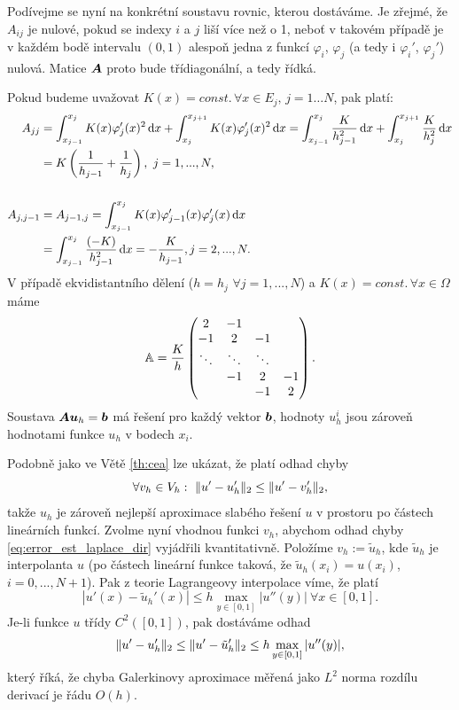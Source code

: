 Podívejme se nyní na konkrétní soustavu rovnic, kterou dostáváme.
Je zřejmé, že $A_{ij}$ je nulové, pokud se indexy $i$ a $j$ liší více než o 1, neboť v takovém případě je v každém bodě intervalu $(0,1)$ alespoň jedna z funkcí $\varphi_i$, $\varphi_j$ (a tedy i $\varphi_i'$, $\varphi_j'$) nulová. Matice $\mathbf{\boldsymbol{A}}$ proto bude třídiagonální, a tedy řídká.

Pokud budeme uvažovat $K(x) = const.\, \forall x\in E_j,\, j = 1\ldots N$, pak platí:
\begin{align*}
A_{jj} &= \int_{x_{j-1}}^{x_j} K(x)\varphi_j'(x)^2\,{\rm d} x + \int_{x_j}^{x_{j+1}} K(x) \varphi_j'(x)^2\,{\rm d} x
= \int_{x_{j-1}}^{x_j}\frac{K}{h_{j-1}^2}\,{\rm d} x + \int_{x_j}^{x_{j+1}}\frac{K}{h_j^2}\,{\rm d} x\\
&= K\left(\frac1{h_{j-1}} + \frac1{h_j}\right),~j=1,...,N,\\\\
A_{j,j-1} &= A_{j-1,j} = \int_{x_{j-1}}^{x_j}K(x)\varphi_{j-1}'(x)\varphi_j'(x)\,{\rm d} x\\
&= \int_{x_{j-1}}^{x_j}\frac{(-K)}{h_{j-1}^2} \,{\rm d} x = -\frac{K}{h_{j-1}}, j=2,...,N.
\end{align*}
V případě ekvidistantního dělení ($h=h_j$ $\forall j=1,...,N$) a $K(x) = const.\, \forall x\in\Omega$ máme
\[ {\mathbb{A}} = \frac{K}{h}\begin{pmatrix}2 & -1 & \\-1 & 2 & -1\\\ddots&\ddots&\ddots\\&-1 & 2 & -1\\&& -1 & 2\end{pmatrix}. \]
Soustava $\mathbf{\boldsymbol{A}}\mathbf{\boldsymbol{u}}_h=\mathbf{\boldsymbol{b}}$ má řešení pro každý vektor $\mathbf{\boldsymbol{b}}$,
hodnoty $u_h^i$ jsou zároveň hodnotami funkce $u_h$ v bodech $x_i$.

Podobně jako ve Větě \ref{th:cea} lze ukázat, že platí odhad chyby
\begin{equation}\label{eq:error_est_laplace_dir}
\forall v_h\in V_h:~\|u'-u_h'\|_2 \le \|u'-v_h'\|_2,
\end{equation}
takže $u_h$ je zároveň nejlepší aproximace slabého řešení $u$ v prostoru po částech lineárních funkcí.
Zvolme nyní vhodnou funkci $v_h$, abychom odhad chyby \eqref{eq:error_est_laplace_dir} vyjádřili kvantitativně.
Položíme $v_h:=\tilde u_h$, kde $\tilde u_h$ je interpolanta $u$ (po částech lineární funkce taková, že $\tilde u_h(x_i)=u(x_i)$, $i=0,...,N+1$).
Pak z teorie Lagrangeovy interpolace víme, že platí
\[ |u'(x)-\tilde u_h'(x)|\le h\max_{y\in[0,1]}|u''(y)| ~\forall x\in[0,1]. \]
Je-li funkce $u$ třídy $C^2([0,1])$, pak dostáváme odhad
\[ \|u'-u_h'\|_2 \le \|u'-\tilde u_h'\|_2 \le h\max_{y\in[0,1]}|u''(y)|, \]
který říká, že chyba Galerkinovy aproximace měřená jako $L^2$ norma rozdílu derivací je řádu $O(h)$.
